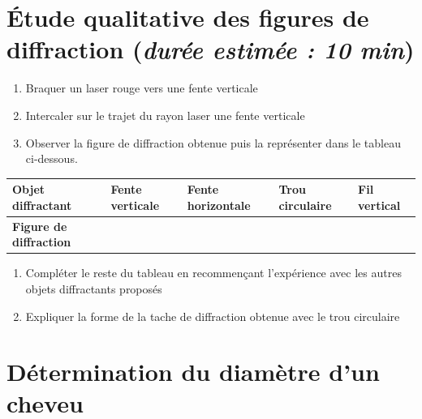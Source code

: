 \documentclass[a4paper,11pt,fleqn]{article}%
\begin{document}
\section{Étude qualitative des figures de diffraction (\emph{durée estimée : 10 min})}
\begin{enumerate}
    \item Braquer un laser rouge vers une fente verticale
    \item Intercaler sur le trajet du rayon laser une fente verticale
    \item Observer la figure de diffraction obtenue puis la représenter dans le tableau ci-dessous.
\end{enumerate}
    \begin{center}
        \begin{tabular}{|>{\centering}m{.17\linewidth}|>{\centering}m{.18\linewidth}|>{\centering}m{.18\linewidth}|>{\centering}m{.17\linewidth}|>{\centering\arraybackslash}m{.17\linewidth}|}
       \hline \textbf{Objet diffractant} & Fente verticale & Fente horizontale & Trou circulaire & Fil vertical\\
        \hline \textbf{Figure de diffraction}&&&&\rule[2cm]{0cm}{0cm}\\
        \hline
    \end{tabular}
    \end{center}
\begin{enumerate}[resume]
    \item Compléter le reste du tableau en recommençant l'expérience avec les autres objets diffractants proposés
    \item Expliquer la forme de la tache de diffraction obtenue avec le trou circulaire
\end{enumerate}

\section{Détermination du diamètre d'un cheveu}
\end{document}

